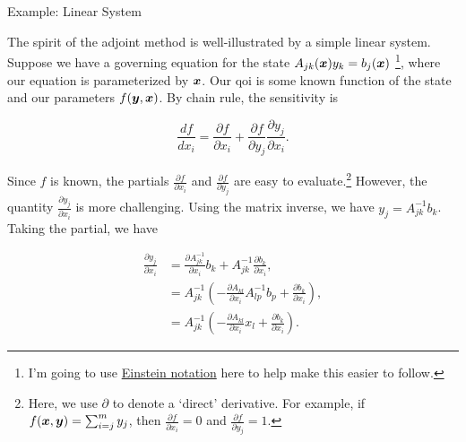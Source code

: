 \documentclass[../primer.tex]{subfiles}
\begin{document}
Example: Linear System

The spirit of the adjoint method is well-illustrated by a simple linear system.
Suppose we have a governing equation for the state \(A_{jk}(\boldsymbol{x})y_k=b_j(\boldsymbol{x})\)
\footnote{I'm going to use \href{https://en.wikipedia.org/wiki/Einstein\_notation}{Einstein notation} here to help make this easier to
follow.}, where our equation is parameterized by \(\boldsymbol{x}\). Our qoi is some known
function of the state and our parameters \(f(\boldsymbol{y},\boldsymbol{x})\). By chain rule, the
sensitivity is

\begin{equation}\label{eq:linear-sens}
\frac{df}{dx_i} = \frac{\partial f}{\partial x_i} %
+ \frac{\partial f}{\partial y_j}\frac{\partial y_j}{\partial x_i}.
\end{equation}

\noindent Since \(f\) is known, the partials \(\frac{\partial f}{\partial x_i}\) and
\(\frac{\partial f}{\partial y_j}\) are easy to evaluate.\footnote{Here, we use
\(\partial\) to denote a `direct' derivative. For example, if
\(f(\boldsymbol{x},\boldsymbol{y})=\sum_{i=j}^my_j\), then \(\frac{\partial f}{\partial x_i}=0\) and
\(\frac{\partial f}{\partial y_j}=1\).} However, the quantity \(\frac{\partial
y_j}{\partial x_i}\) is more challenging. Using the matrix inverse, we have
\(y_j=A_{jk}^{-1}b_k\). Taking the partial, we have\footnotemark


\begin{equation}\begin{aligned}
\frac{\partial y_j}{\partial x_i} &= \frac{\partial A^{-1}_{jk}}{\partial x_i}b_k + A^{-1}_{jk}\frac{\partial b_k}{\partial x_i}, \\
&= A^{-1}_{jk}\left(-\frac{\partial A_{kl}}{\partial x_i}A^{-1}_{lp}b_p+\frac{\partial b_k}{\partial x_i}\right), \\
&= A^{-1}_{jk}\left(-\frac{\partial A_{kl}}{\partial x_i}x_l+\frac{\partial b_k}{\partial x_i}\right).
\end{aligned}\end{equation}

\end{document}
